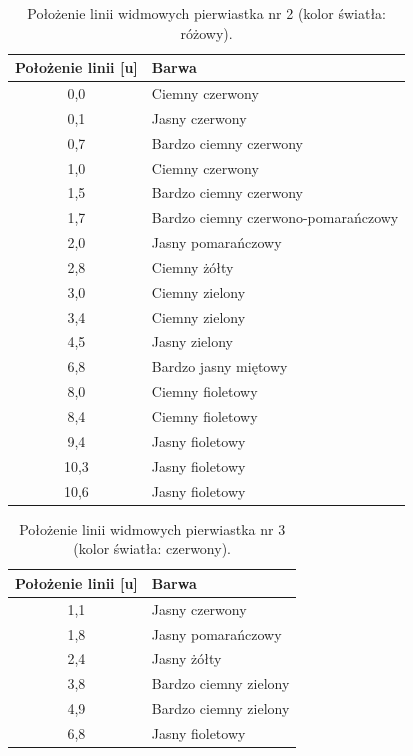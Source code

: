 \documentclass[a4paper,12pt]{article}
\begin{document}
\begin{table}[H]
    \centering
    \begin{tabular}{|c|l|}
        \hline
        Położenie linii [u] & Barwa \\ \hline
        0{,}0 & Ciemny czerwony \\ \hline
        0{,}1 & Jasny czerwony \\ \hline
        0{,}7 & Bardzo ciemny czerwony \\ \hline
        1{,}0 & Ciemny czerwony \\ \hline
        1{,}5 & Bardzo ciemny czerwony \\ \hline
        1{,}7 & Bardzo ciemny czerwono-pomarańczowy \\ \hline
        2{,}0 & Jasny pomarańczowy \\ \hline
        2{,}8 & Ciemny żółty \\ \hline
        3{,}0 & Ciemny zielony \\ \hline
        3{,}4 & Ciemny zielony \\ \hline
        4{,}5 & Jasny zielony \\ \hline
        6{,}8 & Bardzo jasny miętowy \\ \hline
        8{,}0 & Ciemny fioletowy \\ \hline
        8{,}4 & Ciemny fioletowy \\ \hline
        9{,}4 & Jasny fioletowy \\ \hline
        10{,}3 & Jasny fioletowy \\ \hline
        10{,}6 & Jasny fioletowy \\ \hline
    \end{tabular}
    \caption{Położenie linii widmowych pierwiastka nr 2 (kolor światła: różowy).}
\end{table}

\begin{table}[H]
    \centering
    \begin{tabular}{|c|l|}
        \hline
        Położenie linii [u] & Barwa \\ \hline
        1{,}1 & Jasny czerwony \\ \hline
        1{,}8 & Jasny pomarańczowy \\ \hline
        2{,}4 & Jasny żółty \\ \hline
        3{,}8 & Bardzo ciemny zielony \\ \hline
        4{,}9 & Bardzo ciemny zielony \\ \hline
        6{,}8 & Jasny fioletowy \\ \hline
    \end{tabular}
    \caption{Położenie linii widmowych pierwiastka nr 3 (kolor światła: czerwony).}
\end{table}
\end{document}
